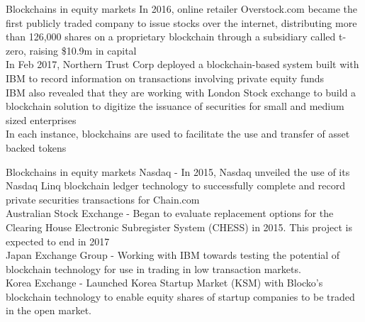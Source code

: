 \documentclass[10pt]{beamer}
\begin{document}

\begin{frame}{Blockchains in equity markets}
	In 2016, online retailer Overstock.com became the first publicly traded company to issue stocks over the internet, distributing more than 126,000 shares on a proprietary blockchain through a subsidiary called t-zero, raising \$10.9m in capital\\ \vspace{3mm}
	In Feb 2017, Northern Trust Corp deployed a blockchain-based system built with IBM to record information on transactions involving private equity funds \\ \vspace{3mm}
	IBM also revealed that they are working with London Stock exchange to build a blockchain solution to digitize the issuance of securities for small and medium sized enterprises\\ \vspace{3mm}
	In each instance, blockchains are used to facilitate the use and transfer of asset backed tokens
\end{frame}



\begin{frame}{Blockchains in equity markets}
	Nasdaq - In 2015, Nasdaq unveiled the use of its Nasdaq Linq blockchain ledger technology to successfully complete and record private securities transactions for Chain.com\\ \vspace{3mm}
	Australian Stock Exchange - Began to evaluate replacement options for the Clearing House Electronic Subregister System (CHESS) in 2015. This project is expected to end in 2017\\ \vspace{3mm}
	Japan Exchange Group - Working with IBM towards testing the potential of blockchain technology for use in trading in low transaction markets.\\ \vspace{3mm}
	Korea Exchange -  Launched Korea Startup Market (KSM) with Blocko's blockchain technology to enable equity shares of startup companies to be traded in the open market.\\ \vspace{3mm}
\end{frame}
\end{document}
